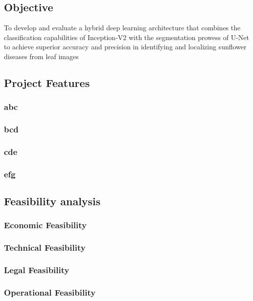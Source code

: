 \subsection{Objective}
To develop and evaluate a hybrid deep learning architecture that combines the classification capabilities of Inception-V2 with the segmentation prowess of U-Net to achieve superior accuracy and precision in identifying and localizing sunflower diseases from leaf images

\clearpage

\subsection{Project Features}
\subsubsection{abc}
\blindtext
\subsubsection{bcd}
\blindtext
\subsubsection{cde}
\blindtext
\subsubsection{efg}
\blindtext

\subsection{Feasibility analysis}
\blindtext
\subsubsection{Economic Feasibility}
\blindtext

\subsubsection{Technical Feasibility}
\blindtext

\subsubsection{Legal Feasibility}
\blindtext

\subsubsection{Operational Feasibility}
\blindtext


\newpage




